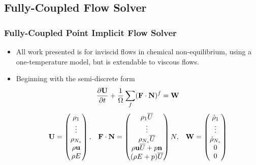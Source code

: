 \documentclass{beamer}
\begin{document}
\subsection{Fully-Coupled Flow Solver}
\begin{frame}
  \frametitle{Fully-Coupled Point Implicit Flow Solver}
  \begin{itemize}
    \item All work presented is for inviscid flows in chemical non-equilibrium,
      using a one-temperature model, but is extendable to viscous flows.
    \item Beginning with the semi-discrete form
    \begin{equation*}
    	\label{inv_flux_fv}
    	\frac{\partial \mathbf U}{\partial t}
    	 + \frac{1}{\Omega}\sum\limits_{f}(\mathbf F \cdot \mathbf{N})^f = \mathbf W
    \end{equation*}
    \begin{equation*}
    	\begin{matrix}
    	\mathbf U=\begin{pmatrix}
       		\rho_1\\
    		\vdots \\
    		\rho_{N_s} \\
    		\rho \mathbf u \\
    		\rho E \\
    	\end{pmatrix},      &
     	\mathbf F \cdot \mathbf{N} = \begin{pmatrix}
    		\rho_1  \overline{U} \\
    		\vdots \\
    		\rho_{N_s} \overline{U} \\
    		\rho \mathbf u \overline{U} + p \mathbf{n} \\
    		(\rho E + p) \overline{U} \\
    	\end{pmatrix} N,    &
     	\mathbf W = \begin{pmatrix}
        \dot\rho_1\\
    		\vdots \\
    		\dot\rho_{N_s} \\
        0 \\
        0
      \end{pmatrix}

  	\end{matrix}
  \end{equation*}

  \end{itemize}
\end{frame}
\end{document}
